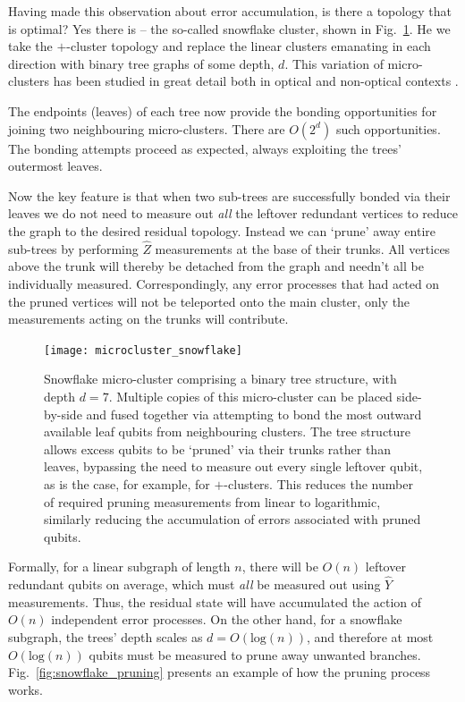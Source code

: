Having made this observation about error accumulation, is there a topology that is optimal? Yes there is -- the so-called snowflake cluster, shown in Fig.~\ref{fig:snowflake_graph}. He we take the $+$-cluster topology and replace the linear clusters emanating in each direction with binary tree graphs of some depth, $d$. This variation of micro-clusters has been studied in great detail both in optical and non-optical contexts \cite{SimonBenjaminPapers}.

The endpoints (leaves) of each tree now provide the bonding opportunities for joining two neighbouring micro-clusters. There are $O(2^d)$ such opportunities. The bonding attempts proceed as expected, always exploiting the trees' outermost leaves.

Now the key feature is that when two sub-trees are successfully bonded via their leaves we do not need to measure out \textit{all} the leftover redundant vertices to reduce the graph to the desired residual topology. Instead we can `prune' away entire sub-trees by performing $\hat{Z}$ measurements at the base of their trunks. All vertices above the trunk will thereby be detached from the graph and needn't all be individually measured. Correspondingly, any error processes that had acted on the pruned vertices will not be teleported onto the main cluster, only the measurements acting on the trunks will contribute.

\begin{figure}[!htb]
\texttt{[image: microcluster\_snowflake]}
\caption{Snowflake micro-cluster comprising a binary tree structure, with depth \mbox{$d=7$}. Multiple copies of this micro-cluster can be placed side-by-side and fused together via attempting to bond the most outward available leaf qubits from neighbouring clusters. The tree structure allows excess qubits to be `pruned' via their trunks rather than leaves, bypassing the need to measure out every single leftover qubit, as is the case, for example, for $+$-clusters. This reduces the number of required pruning measurements from linear to logarithmic, similarly reducing the accumulation of errors associated with pruned qubits.} \label{fig:snowflake_graph}
\end{figure}

Formally, for a linear subgraph of length $n$, there will be $O(n)$ leftover redundant qubits on average, which must \textit{all} be measured out using $\hat{Y}$ measurements. Thus, the residual state will have accumulated the action of $O(n)$ independent error processes. On the other hand, for a snowflake subgraph, the trees' depth scales as \mbox{$d=O(\text{log}(n))$}, and therefore at most \mbox{$O(\text{log}(n))$} qubits must be measured to prune away unwanted branches. Fig.~\ref{fig:snowflake_pruning} presents an example of how the pruning process works.

